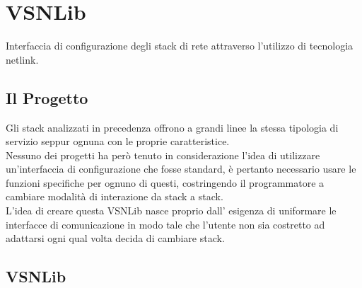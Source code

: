 

\chapter{VSNLib}                %
\lhead[\fancyplain{}{\bfseries\thepage}]{\fancyplain{}{\bfseries\rightmark}}
Interfaccia di configurazione degli stack di rete attraverso l'utilizzo di tecnologia netlink.
\section{Il Progetto}                 %
Gli stack analizzati in precedenza offrono a grandi linee la stessa tipologia di servizio seppur ognuna con le proprie caratteristice.\\
Nessuno dei progetti ha per\`o tenuto in considerazione l'idea di utilizzare un'interfaccia di configurazione che fosse standard, \`e pertanto necessario usare le funzioni specifiche per ognuno di questi, costringendo il programmatore a cambiare modalit\`a di interazione da stack a stack.\\
L'idea di creare questa VSNLib nasce proprio dall' esigenza di uniformare le interfacce di comunicazione in modo tale che l'utente non sia costretto ad adattarsi ogni qual volta decida di cambiare stack.\\
\section{VSNLib}
